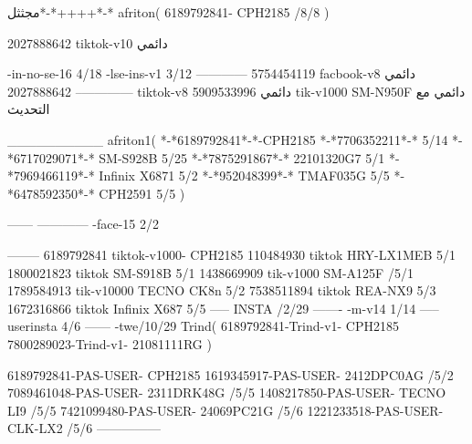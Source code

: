 مجثثل*-*++++*-*
afriton(
6189792841- CPH2185  /8/8
)

2027888642 tiktok-v10
دائمي

-in-no-se-16 4/18
-lse-ins-v1 3/12
------------
5754454119 facbook-v8
دائمي
--------------
2027888642 tiktok-v8
دائمي
5909533996 tik-v1000  SM-N950F
دائمي مع التحديث

__________
afriton1(
*-*6189792841*-*-CPH2185
*-*7706352211*-* 5/14
*-*6717029071*-*  SM-S928B 5/25
*-*7875291867*-* 22101320G7 5/1
*-*7969466119*-* Infinix X6871 5/2
*-*952048399*-* TMAF035G 5/5
*-*6478592350*-* CPH2591 5/5
)


------
------------
-face-15 2/2

--------
6189792841 tiktok-v1000- CPH2185 
110484930 tiktok HRY-LX1MEB  5/1
1800021823 tiktok SM-S918B  5/1
1438669909 tik-v1000 SM-A125F /5/1
1789584913 tik-v10000  TECNO CK8n 5/2
7538511894 tiktok REA-NX9  5/3
1672316866 tiktok Infinix X687  5/5
-----
 INSTA /2/29
-------
-m-v14 1/14
-----
userinsta 4/6
------
-twe/10/29
Trind(
6189792841-Trind-v1- CPH2185 
7800289023-Trind-v1- 21081111RG \5\5
)

6189792841-PAS-USER- CPH2185 
1619345917-PAS-USER- 2412DPC0AG /5/2
7089461048-PAS-USER- 2311DRK48G /5/5
1408217850-PAS-USER- TECNO LI9 /5/5
7421099480-PAS-USER- 24069PC21G /5/6
1221233518-PAS-USER- CLK-LX2 /5/6
    ---------------

